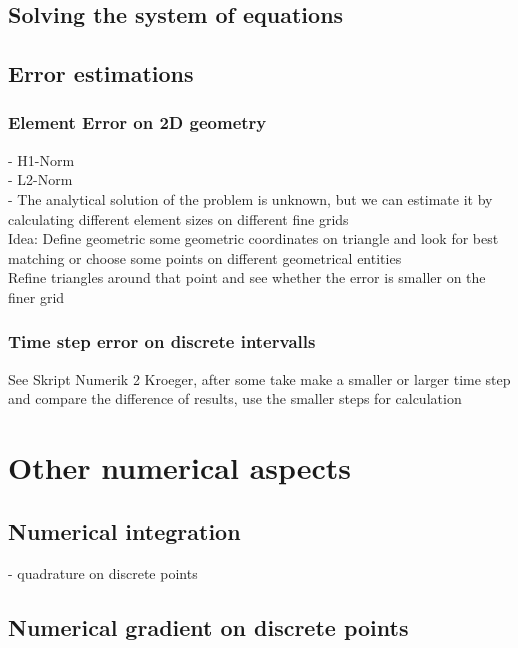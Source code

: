 \documentclass[parskip=half, titlepage=yes, 12pt, BCOR=12mm, DIV=calc]{scrartcl}
\begin{document}
\subsection{Solving the system of equations}

\subsection{Error estimations}

\subsubsection{Element Error on 2D geometry}
- H1-Norm \\
- L2-Norm \\

- The analytical solution of the problem is unknown, but we can estimate it by calculating different element sizes on different fine grids \\

Idea: Define geometric some geometric coordinates on triangle and look for best matching or choose some points on different geometrical entities \\

Refine triangles around that point and see whether the error is smaller on the finer grid \\

\subsubsection{Time step error on discrete intervalls}

See Skript Numerik 2 Kroeger, after some take make a smaller or larger time step and compare the difference of results, use the smaller steps for calculation \\


\newpage


\section{Other numerical aspects }
\subsection{Numerical integration}
- quadrature on discrete points \\

\subsection{Numerical gradient on discrete points}
\end{document}
